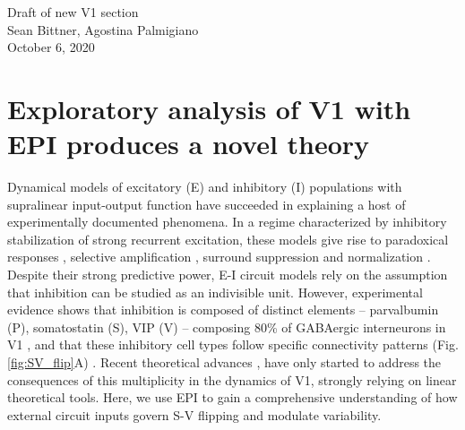 \documentclass[11pt]{article}
\begin{document}
\medskip                        %

\thispagestyle{plain}
\begin{center}                  %
{\Large Draft of new V1 section} \\
Sean Bittner, Agostina Palmigiano \\
October 6, 2020 \\
\end{center}

\section{Exploratory analysis of V1 with EPI produces a novel theory}\label{results_V1}
Dynamical models of excitatory (E) and inhibitory (I) populations with supralinear input-output function have succeeded in explaining a host of experimentally documented phenomena.
In a regime characterized by inhibitory stabilization of strong recurrent excitation, these models give rise to paradoxical responses \cite{tsodyks1997paradoxical}, selective amplification  \cite{goldman2009memory, murphy2009balanced}, surround suppression \cite{ozeki2009inhibitory} and normalization \cite{rubin2015stabilized}. 
Despite their strong predictive power, E-I circuit models rely on the assumption that inhibition can be studied as an indivisible unit. 
However, experimental evidence shows that inhibition is composed of distinct elements -- parvalbumin (P), somatostatin (S), VIP (V) --
composing 80\% of GABAergic interneurons in V1 \cite{markram2004interneurons, rudy2011three, tremblay2016}, and that these inhibitory cell types follow specific connectivity patterns (Fig. \ref{fig:SV_flip}A) \cite{pfeffer2013inhibition}.
Recent theoretical advances \cite{litwin2016inhibitory, GarciaDelMolino2017, Chen2019},  have only started to address the consequences of this multiplicity in the dynamics of V1, strongly relying on linear theoretical tools. 
Here, we use EPI to gain a comprehensive understanding of how external circuit inputs govern S-V flipping and modulate variability.
\end{document}
